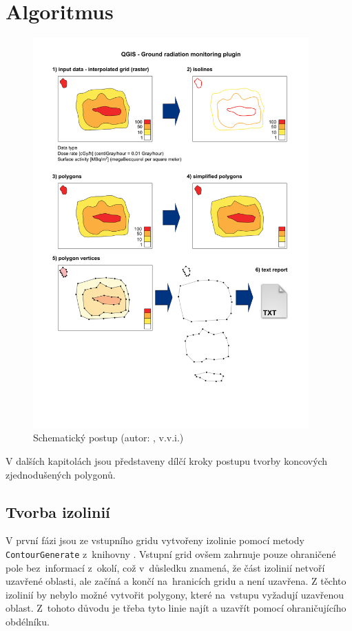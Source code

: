 \section{Algoritmus}

\begin{figure}[H]
    \centering
      \includegraphics[width=300pt]{./pictures/ACR_radiacni_pruzkum_polygony_v3.png}
      \caption[Schematický postup]{Schematický postup (autor: , v.v.i.)}
      \label{fig:schema}
\end{figure}

V dalších kapitolách jsou představeny dílčí kroky postupu tvorby
koncových zjedno\-dušených polygonů.

\subsection{Tvorba izolinií}

V první fázi jsou ze vstupního gridu vytvořeny izolinie pomocí metody
\texttt{ContourGene\-rate} z~knihovny . Vstupní grid ovšem
zahrnuje pouze ohraničené pole bez~informací z~okolí, což v~důsledku znamená, že
část izolinií netvoří uzavřené oblasti, ale začíná a končí 
na~hranicích gridu a není uzavřena. Z těchto izolinií by nebylo možné
vytvořit polygony, které na~vstupu vyžadují uzavřenou oblast. Z~tohoto
důvodu je třeba tyto linie najít a uzavřít pomocí ohraničujícího
obdélníku.

